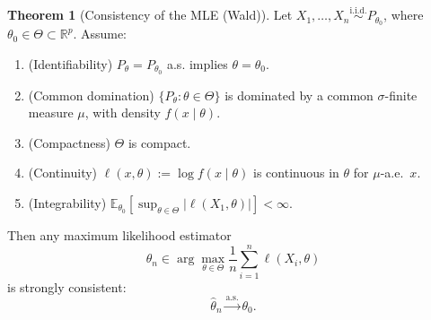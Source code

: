 \documentclass[11pt]{article}
\theoremstyle{definition}
\newtheorem{theo}{Theorem}[section]
\begin{document}
\begin{theo}[Consistency of the MLE (Wald)]
Let \(X_1, \dots, X_n \overset{\mathrm{i.i.d.}}{\sim} P_{\theta_0}\), where \(\theta_0 \in \Theta \subset \mathbb{R}^p\).
Assume:

\begin{enumerate}
  \item (Identifiability) \(P_\theta = P_{\theta_0}\) a.s. implies \(\theta = \theta_0\).
  \item (Common domination) \(\{P_\theta : \theta \in \Theta\}\) is dominated by a common $\sigma$-finite measure $\mu$, with density \(f(x \mid \theta)\).
  \item (Compactness) \(\Theta\) is compact.
  \item (Continuity) \(\ell(x, \theta) := \log f(x \mid \theta)\) is continuous in \(\theta\) for $\mu$-a.e.\ $x$.
  \item (Integrability) \(\mathbb{E}_{\theta_0}\!\left[ \sup_{\theta \in \Theta} |\ell(X_1, \theta)| \right] < \infty\).
\end{enumerate}
Then any maximum likelihood estimator
\[
\hat{\theta}_n
\in \arg\max_{\theta \in \Theta} \frac{1}{n} \sum_{i=1}^n \ell(X_i, \theta)
\]
is strongly consistent:
\[
\hat{\theta}_n \xrightarrow{\text{a.s.}} \theta_0.
\]
\end{theo}
\end{document}

